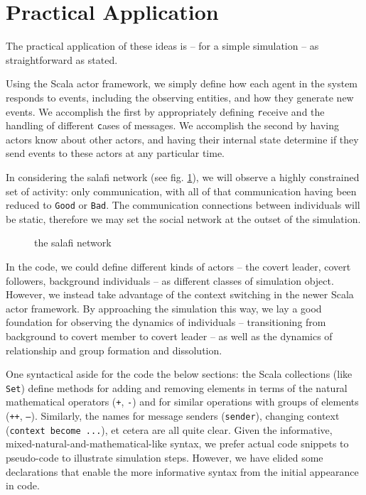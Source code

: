 \documentclass{article}
\newcommand{\wantFig}[2]{
  \begin{figure}[h]\centering
    \missingfigure{}
    \caption{#2}
    \figlabel{#1}
  \end{figure}
}
\newcommand{\figlabel}[1]{\label{fig_#1}}
\newcommand{\figref}[1]{fig. \ref{fig_#1}}
\begin{document}
\section*{Practical Application}
The practical application of these ideas is -- for a simple simulation -- as straightforward as stated.

Using the Scala actor framework, we simply define how each agent in the system responds to events, including the observing entities, and how they generate new events.  We accomplish the first by appropriately defining {\texttt receive} and the handling of different {\texttt case}s of messages.  We accomplish the second by having actors know about other actors, and having their internal state determine if they send events to these actors at any particular time.

In considering the salafi network (see \figref{salafi_network}), we will observe a highly constrained set of activity: only communication, with all of that communication having been reduced to \texttt{Good} or \texttt{Bad}.  The communication connections between individuals will be static, therefore we may set the social network at the outset of the simulation.

\wantFig{salafi_network}{the salafi network}

In the code, we could define different kinds of actors -- the covert leader, covert followers, background individuals -- as different classes of simulation object.  However, we instead take advantage of the context switching in the newer Scala actor framework.  By approaching the simulation this way, we lay a good foundation for observing the dynamics of individuals -- transitioning from background to covert member to covert leader -- as well as the dynamics of relationship and group formation and dissolution.

One syntactical aside for the code the below sections: the Scala collections (like \texttt{Set}) define methods for adding and removing elements in terms of the natural mathematical operators (\texttt{+}, \texttt{-}) and for similar operations with groups of elements (\texttt{++}, \texttt{--}).  Similarly, the names for message senders (\texttt{sender}), changing context (\texttt{context become ...}), et cetera are all quite clear.  Given the informative, mixed-natural-and-mathematical-like syntax, we prefer actual code snippets to pseudo-code to illustrate simulation steps.  However, we have elided some declarations that enable the more informative syntax from the initial appearance in code.
\end{document}
